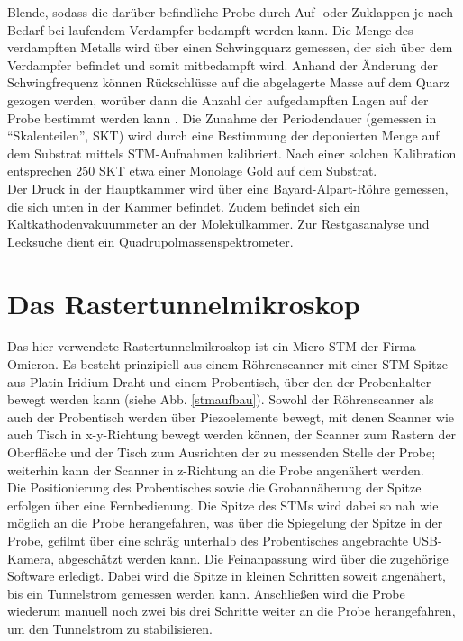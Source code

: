 Blende, sodass die darüber befindliche Probe durch Auf- oder Zuklappen je nach Bedarf bei
laufendem Verdampfer bedampft werden kann. Die Menge des verdampften Metalls wird über einen
Schwingquarz gemessen, der sich über dem Verdampfer befindet und somit mitbedampft wird. Anhand der
Änderung der Schwingfrequenz können Rückschlüsse auf die abgelagerte Masse auf dem Quarz gezogen
werden, worüber dann die Anzahl der aufgedampften Lagen auf der Probe bestimmt werden kann
\cite{Sau}.
Die Zunahme der Periodendauer (gemessen in "`Skalenteilen"', SKT) wird durch eine Bestimmung der
deponierten Menge auf dem Substrat mittels STM-Aufnahmen kalibriert. Nach einer solchen Kalibration
entsprechen 250 SKT etwa einer Monolage Gold auf dem Substrat.
\\
Der Druck in der Hauptkammer wird über eine Bayard-Alpart-Röhre gemessen, die sich unten in der
Kammer befindet. Zudem befindet sich ein Kaltkathodenvakuummeter an der Molekülkammer.
Zur Restgasanalyse und Lecksuche dient ein Quadrupolmassenspektrometer.


\section{Das Rastertunnelmikroskop}

Das hier verwendete Rastertunnelmikroskop ist ein Micro-STM der Firma Omicron. Es besteht
prinzipiell aus einem Röhrenscanner mit einer STM-Spitze aus Platin-Iridium-Draht und einem
Probentisch, über den der Probenhalter bewegt werden kann (siehe Abb. \ref{stmaufbau}). Sowohl der
Röhren\-scanner als auch der Probentisch werden über Piezoelemente bewegt, mit denen Scanner
wie auch Tisch in x-y-Richtung bewegt werden können, der Scanner zum Rastern der Oberfläche und der
Tisch zum Ausrichten der zu messenden Stelle der Probe; weiterhin kann der Scanner in z-Richtung an
die Probe angenähert werden.
\\
Die Positionierung des Probentisches sowie die  Grobannäherung der Spitze erfolgen über eine
Fernbedienung. Die Spitze des STMs wird dabei so nah wie möglich an die Probe herangefahren, was
über die Spiegelung der Spitze in der Probe, gefilmt über eine schräg unterhalb des Probentisches
angebrachte USB-Kamera, abgeschätzt werden kann. Die Feinanpassung wird über die zugehörige
Software erledigt.
Dabei wird die Spitze in kleinen Schritten soweit angenähert, bis ein Tunnelstrom gemessen werden
kann. Anschließen wird die Probe wiederum manuell noch zwei bis drei Schritte weiter an die Probe
herangefahren, um den Tunnelstrom zu stabilisieren.
\\

